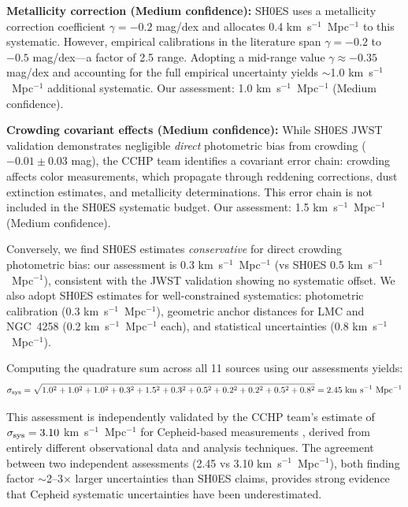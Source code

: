 \documentclass[twocolumn, linenumbers]{aastex701}
\begin{document}
\textbf{Metallicity correction (Medium confidence):} SH0ES uses a metallicity correction coefficient $\gamma = -0.2$ mag/dex and allocates 0.4 km~s$^{-1}$~Mpc$^{-1}$ to this systematic. However, empirical calibrations in the literature span $\gamma = -0.2$ to $-0.5$ mag/dex---a factor of 2.5 range. Adopting a mid-range value $\gamma \approx -0.35$ mag/dex and accounting for the full empirical uncertainty yields $\sim$1.0 km~s$^{-1}$~Mpc$^{-1}$ additional systematic. Our assessment: 1.0 km~s$^{-1}$~Mpc$^{-1}$ (Medium confidence).

\textbf{Crowding covariant effects (Medium confidence):} While SH0ES JWST validation \citep{Riess2024JWST} demonstrates negligible \textit{direct} photometric bias from crowding ($-0.01 \pm 0.03$ mag), the CCHP team \citep{Freedman2024} identifies a covariant error chain: crowding affects color measurements, which propagate through reddening corrections, dust extinction estimates, and metallicity determinations. This error chain is not included in the SH0ES systematic budget. Our assessment: 1.5 km~s$^{-1}$~Mpc$^{-1}$ (Medium confidence).

Conversely, we find SH0ES estimates \textit{conservative} for direct crowding photometric bias: our assessment is 0.3 km~s$^{-1}$~Mpc$^{-1}$ (vs SH0ES 0.5 km~s$^{-1}$~Mpc$^{-1}$), consistent with the JWST validation showing no systematic offset. We also adopt SH0ES estimates for well-constrained systematics: photometric calibration (0.3 km~s$^{-1}$~Mpc$^{-1}$), geometric anchor distances for LMC and NGC~4258 (0.2 km~s$^{-1}$~Mpc$^{-1}$ each), and statistical uncertainties (0.8 km~s$^{-1}$~Mpc$^{-1}$).

Computing the quadrature sum across all 11 sources using our assessments yields:
\begin{equation}
\sigma_{\rm sys} = \sqrt{1.0^2 + 1.0^2 + 1.0^2 + 0.3^2 + 1.5^2 + 0.3^2 + 0.5^2 + 0.2^2 + 0.2^2 + 0.5^2 + 0.8^2} = 2.45~{\rm km~s^{-1}~Mpc^{-1}}
\end{equation}

This assessment is independently validated by the CCHP team's estimate of $\sigma_{\rm sys} = 3.10$ km~s$^{-1}$~Mpc$^{-1}$ for Cepheid-based measurements \citep{Freedman2024}, derived from entirely different observational data and analysis techniques. The agreement between two independent assessments (2.45 vs 3.10 km~s$^{-1}$~Mpc$^{-1}$), both finding factor $\sim$2--3$\times$ larger uncertainties than SH0ES claims, provides strong evidence that Cepheid systematic uncertainties have been underestimated.
\end{document}
